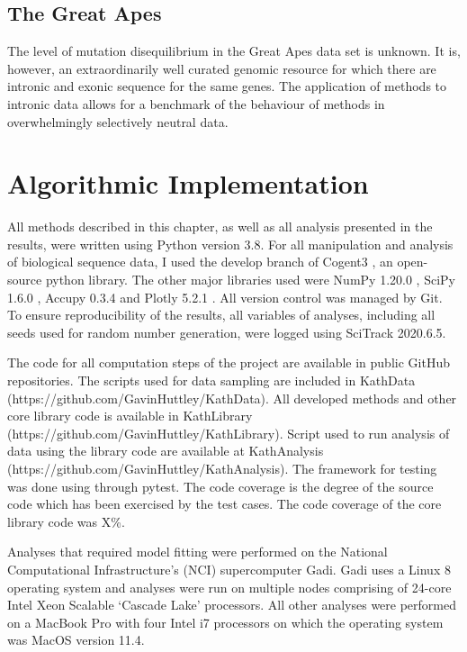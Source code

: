 \subsection{The Great Apes}

The level of mutation disequilibrium in the Great Apes data set is unknown. It is, however, an extraordinarily well curated genomic resource for which there are intronic and exonic sequence for the same genes. The application of methods to intronic data allows for a benchmark of the behaviour of methods in overwhelmingly selectively neutral data. 

\section{Algorithmic Implementation}

All methods described in this chapter, as well as all analysis presented in the results, were written using Python version 3.8. For all manipulation and analysis of biological sequence data, I used the develop branch of Cogent3 \citep{Knight2007PyCogent:Sequence}, an open-source python library. The other major libraries used were NumPy 1.20.0 \citep{VanDerWalt2011TheComputation}, SciPy 1.6.0 \citep{SciPy2001}, Accupy 0.3.4 \citep{accupy} and Plotly 5.2.1 \citep{plotly}. All version control was managed by Git. To ensure reproducibility of the results, all variables of analyses, including all seeds used for random number generation, were logged using SciTrack 2020.6.5.

The code for all computation steps of the project are available in public GitHub repositories. The scripts used for data sampling are included in KathData (https://github.com/GavinHuttley/KathData). All developed methods and other core library code is available in KathLibrary (https://github.com/GavinHuttley/KathLibrary). Script used to run analysis of data using the library code are available at KathAnalysis (https://github.com/GavinHuttley/KathAnalysis). The framework for testing was done using through pytest. The code coverage is the degree of the source code which has been exercised by the test cases. The code coverage of the core library code was X\%. 

Analyses that required model fitting were performed on the National Computational Infrastructure's (NCI) supercomputer Gadi. Gadi uses a Linux 8 operating system and analyses were run on multiple nodes comprising of 24-core Intel Xeon Scalable `Cascade Lake’ processors. All other analyses were performed on a MacBook Pro with four Intel i7 processors on which the  operating system was MacOS version 11.4. 

